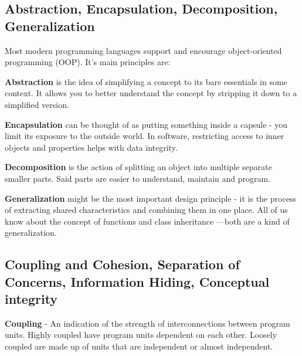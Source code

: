 \documentclass[12pt,a4paper,titlepage]{article}
\begin{document}
\subsection{Abstraction, Encapsulation, Decomposition, Generalization}
Most modern programming languages support and encourage object-oriented programming (OOP). It's main principles are:\par \textbf{Abstraction} is the idea of simplifying a concept to its bare essentials in some context. It allows you to better understand the concept by stripping it down to a simplified version.\par \textbf{Encapsulation} can be thought of as putting something inside a capsule - you limit its exposure to the outside world. In software, restricting access to inner objects and properties helps with data integrity.\par \textbf{Decomposition} is the action of splitting an object into multiple separate smaller parts. Said parts are easier to understand, maintain and program.\par \textbf{Generalization} might be the most important design principle - it is the process of extracting shared characteristics and combining them in one place. All of us know about the concept of functions and class inheritance —both are a kind of generalization.\par

\subsection{Coupling and Cohesion, Separation of Concerns, Information Hiding, Conceptual integrity}
\textbf{Coupling} - An indication of the strength of interconnections between program units.
Highly coupled have program units dependent on each other. Loosely coupled are made up of units that are independent or almost independent.\par
\end{document}
